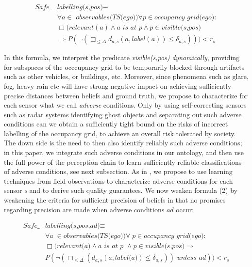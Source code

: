 \begin{align}\label{eq:safelabelling(s,pos)}
    \textit{Safe}\_&\textit{labelling(s,pos)} \equiv 					\\		
 & \forall a\in\textit{ observables(TS(ego))}\forall p \in \textit{occupancy grid(ego)}:\nonumber\\  
& \Box (\textit{relevant}(a) \land a \textit{ is at } p\land p\in \textit{visible(s,pos)} \nonumber\\
& \Rightarrow P(\neg( \Box_{\leq\Delta} d_{a,s}(a,\textit{label}(a))\leq\delta_{a,s}))) < r_s\nonumber
\end{align}

In this formula, we interpret the predicate \textit{visible(s,pos)} \emph{dynamically}, providing for subspaces of the occcupancy grid to be temporarily blocked through artifacts such as other vehicles, or buildings, etc. Moreover, since phenomena such as glare, fog, heavy rain etc will have strong negative impact on achieving sufficiently precise distances between beliefs and ground truth, we propose to characterize for each sensor what we call \emph{adverse} conditions. Only by using self-correcting sensors such as radar systems identifying ghost objects and separating out such adverse conditions can we obtain a sufficiently tight bound on the risks of incorrect labelling of the occupancy grid, to achieve an overall risk tolerated by society. The down side is the need to then also identify reliably such adverse conditions; in this paper, we integrate such adverse conditions in our ontology, and then use the full power of the perception chain to learn sufficiently reliable classifications of adverse conditions, see next subsection. As in \cite{galbas}, we propose to use learning techniques from field observations to characterize adverse conditions for each sensor \textit{s} and to derive such quality guarantees. We now weaken formula (2) by weakening the criteria for sufficient precision of beliefs in that no promises regarding precision are made when adverse conditions $ad$ occur:

\begin{align}\label{eq:safelabelling(s,pos,ad)}
\textit{Safe}\_&\textit{labelling(s,pos,ad)} \equiv\\  			
&\forall a\in \textit{observables(TS(ego))}\forall p\in\textit{occupancy grid(ego)}\nonumber:\\
&\Box(\textit{relevant(a)} \land a\textit{ is at p }\land p\in\textit{visible(s,pos)} \Rightarrow\nonumber\\
&P(\neg(\Box_{\leq\Delta} (d_{a,s}(a, \textit{label(a)})\leq \delta_{a,s}))\textit{ unless } ad)) < r_s\nonumber
\end{align}


